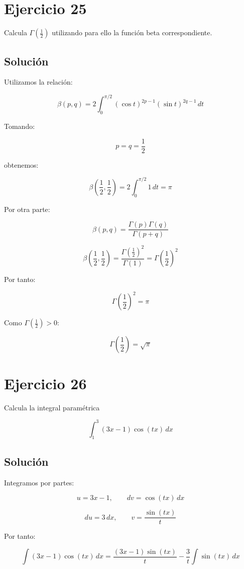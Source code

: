 \documentclass[fleqn]{article}
\begin{document}
\section{Ejercicio 25}
	Calcula $\Gamma\left(\frac{1}{2}\right)$ utilizando para ello la función beta correspondiente.

	\subsection{Solución}

	Utilizamos la relación:

	\[
	\beta(p,q)
	=
	2\int_0^{\pi/2}
	(\cos t)^{2p-1}
	(\sin t)^{2q-1}\,dt
	\]

	Tomando:

	\[
	p=q=\frac{1}{2}
	\]

	obtenemos:

	\[
	\beta\left(\frac{1}{2},\frac{1}{2}\right)
	=
	2\int_0^{\pi/2}1\,dt
	=
	\pi
	\]

	Por otra parte:

	\[
	\beta(p,q)
	=
	\frac{\Gamma(p)\Gamma(q)}
	{\Gamma(p+q)}
	\]

	\[
	\beta\left(\frac{1}{2},\frac{1}{2}\right)
	=
	\frac{
	\Gamma\left(\frac{1}{2}\right)^2
	}{
	\Gamma(1)
	}
	=
	\Gamma\left(\frac{1}{2}\right)^2
	\]

	Por tanto:

	\[
	\Gamma\left(\frac{1}{2}\right)^2
	=
	\pi
	\]

	Como $\Gamma\left(\frac{1}{2}\right)>0$:

	\[
	\boxed{
	\Gamma\left(\frac{1}{2}\right)=\sqrt{\pi}
	}
	\]

\section{Ejercicio 26}
	Calcula la integral paramétrica

	\[
	\int_1^3(3x-1)\cos(tx)\,dx
	\]

	\subsection{Solución}

	Integramos por partes:

	\[
	u=3x-1,
	\qquad
	dv=\cos(tx)\,dx
	\]

	\[
	du=3\,dx,
	\qquad
	v=\frac{\sin(tx)}{t}
	\]

	Por tanto:

	\[
	\int(3x-1)\cos(tx)\,dx
	=
	\frac{(3x-1)\sin(tx)}{t}
	-
	\frac{3}{t}\int\sin(tx)\,dx
	\]
\end{document}
